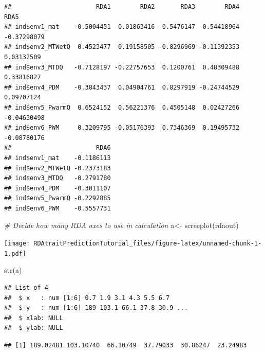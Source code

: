 \documentclass[
]{article}
\newenvironment{Shaded}{\begin{snugshade}}{\end{snugshade}}
\newcommand{\CommentTok}[1]{\textcolor[rgb]{0.56,0.35,0.01}{\textit{#1}}}
\newcommand{\FunctionTok}[1]{\textcolor[rgb]{0.00,0.00,0.00}{#1}}
\newcommand{\NormalTok}[1]{#1}
\newcommand{\OtherTok}[1]{\textcolor[rgb]{0.56,0.35,0.01}{#1}}
\newcommand{\SpecialCharTok}[1]{\textcolor[rgb]{0.00,0.00,0.00}{#1}}
\begin{document}
\begin{verbatim}
##                       RDA1        RDA2       RDA3        RDA4        RDA5
## ind$env1_mat    -0.5004451  0.01863416 -0.5476147  0.54418964 -0.37298079
## ind$env2_MTWetQ  0.4523477  0.19158505 -0.8296969 -0.11392353  0.03132509
## ind$env3_MTDQ   -0.7128197 -0.22757653  0.1200761  0.48309488  0.33816827
## ind$env4_PDM    -0.3843437  0.04904761  0.8297919 -0.24744529  0.09707124
## ind$env5_PwarmQ  0.6524152  0.56221376  0.4505148  0.02427266 -0.04630498
## ind$env6_PWM     0.3209795 -0.05176393  0.7346369  0.19495732 -0.08780176
##                       RDA6
## ind$env1_mat    -0.1186113
## ind$env2_MTWetQ -0.2373183
## ind$env3_MTDQ   -0.2791780
## ind$env4_PDM    -0.3011107
## ind$env5_PwarmQ -0.2292885
## ind$env6_PWM    -0.5557731
\end{verbatim}

\begin{Shaded}
\begin{Highlighting}[]
\CommentTok{\# Decide how many RDA axes to use in calculation}
\NormalTok{  a}\OtherTok{\textless{}{-}} \FunctionTok{screeplot}\NormalTok{(rdaout)}
\end{Highlighting}
\end{Shaded}

\texttt{[image: RDAtraitPredictionTutorial\_files/figure-latex/unnamed-chunk-1-1.pdf]}

\begin{Shaded}
\begin{Highlighting}[]
  \FunctionTok{str}\NormalTok{(a)}
\end{Highlighting}
\end{Shaded}

\begin{verbatim}
## List of 4
##  $ x   : num [1:6] 0.7 1.9 3.1 4.3 5.5 6.7
##  $ y   : num [1:6] 189 103.1 66.1 37.8 30.9 ...
##  $ xlab: NULL
##  $ ylab: NULL
\end{verbatim}

\begin{Shaded}
\end{Shaded}

\begin{verbatim}
## [1] 189.02481 103.10740  66.10749  37.79033  30.86247  23.24983
\end{verbatim}
\end{document}
